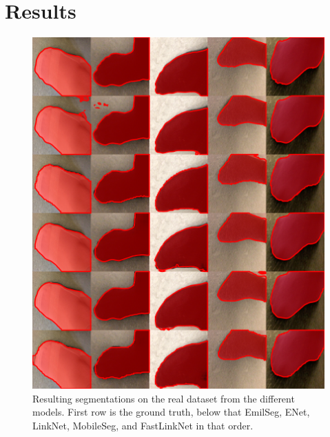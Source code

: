 \documentclass{kththesis}
\begin{document}
\chapter{Results}
\begin{figure}[h]
  \centering
  \includegraphics[width=\textwidth]{real_color}
  \caption{Resulting segmentations on the real dataset from the different models. First row is the ground
    truth, below that EmilSeg, ENet, LinkNet, MobileSeg, and FastLinkNet in that
    order.}
  \label{fig:seg_real}
  \end{figure}
\end{document}
